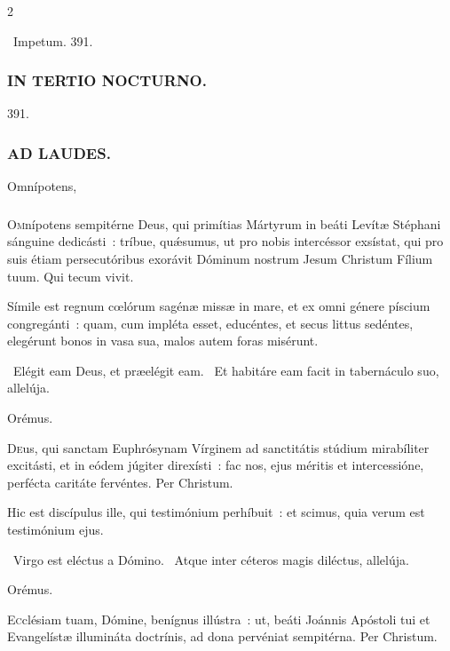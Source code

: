 \documentclass[9pt,twoside]{extarticle}
\begin{document}
\begin{multicols}{2}
\begin{tightlist}{}
\item {}~Impetum. 391.
\end{tightlist}

\subsubsection*{\center \textsc{IN TERTIO NOCTURNO.}}
\begin{tightlist}{}
\item {} 391.
\end{tightlist}

\subsubsection*{\center \textsc{AD LAUDES.}}
\begin{tightlist}{}
\item {} Omnípotens, 
\end{tightlist}
\subsubsection*{\center {}}
\lettrine{O}mnípotens sempitérne Deus, qui primítias Mártyrum in beáti Levítæ Stéphani sánguine dedicásti~: tríbue, quǽsumus, ut pro nobis intercéssor exsístat, qui pro suis étiam persecutóribus exorávit Dóminum nostrum Jesum Christum Fílium tuum. Qui tecum vivit.

\begin{tightlist}{}
\item {} Símile est regnum cœlórum sagénæ missæ in mare, et ex omni génere píscium congregánti~: quam, cum impléta esset, educéntes, et secus littus sedéntes, elegérunt bonos in vasa sua, malos autem foras misérunt.
\item {}~Elégit eam Deus, et præelégit eam. ~Et habitáre eam facit in tabernáculo suo, allelúja.
\item Orémus. \hfill {}
\end{tightlist}
\lettrine{D}eus, qui sanctam Euphrósynam Vírginem ad sanctitátis stúdium mirabíliter excitásti, et in eódem júgiter direxísti~: fac nos, ejus méritis et intercessióne, perfécta caritáte fervéntes. Per Christum.

\begin{tightlist}{}
\item {} Hic est discípulus ille, qui testimónium perhíbuit~: et scimus, quia verum est testimónium ejus.
\item {}~Virgo est eléctus a Dómino. ~Atque inter céteros magis diléctus, allelúja.
\item Orémus. \hfill {}
\end{tightlist}
\lettrine{E}cclésiam tuam, Dómine, benígnus illústra~: ut, beáti Joánnis Apóstoli tui et Evangelístæ illumináta doctrínis, ad dona pervéniat sempitérna. Per Christum.



\end{multicols}
\end{document}
